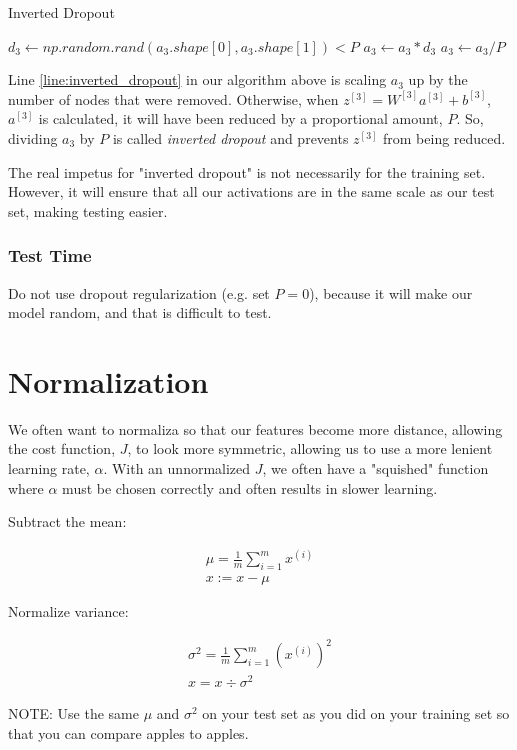 \documentclass{article}
\begin{document}
\begin{algorithm}[h]
\caption{Inverted Dropout}
$d_3 \gets np.random.rand(a_3.shape[0], a_3.shape[1]) < P$ \;
$a_3 \gets a_3 * d_3$ \;
$a_3 \gets a_3 / P$ \; \label{line:inverted_dropout}
\end{algorithm}

Line \ref{line:inverted_dropout} in our algorithm above is scaling $a_3$ up by the number of nodes that were removed.  Otherwise, when $z^{[3]} = W^{[3]} a^{[3]} + b^{[3]}$, $a^{[3]}$ is calculated, it will have been reduced by a proportional amount, $P$.  So, dividing $a_3$ by $P$ is called \textit{inverted dropout} and prevents $z^{[3]}$ from being reduced.

The real impetus for "inverted dropout" is not necessarily for the training set.  However, it will ensure that all our activations are in the same scale as our test set, making testing easier.

\subsubsection{Test Time}

Do not use dropout regularization (e.g. set $P = 0$), because it will make our model random, and that is difficult to test.

\section{Normalization}

We often want to normaliza so that our features become more distance, allowing the cost function, $J$, to look more symmetric, allowing us to use a more lenient learning rate, $\alpha$.  With an unnormalized $J$, we often have a "squished" function where $\alpha$ must be chosen correctly and often results in slower learning.

Subtract the mean:

\begin{gather}
\mu = \frac{1}{m} \sum_{i=1}^{m} x^{(i)} \\
x := x - \mu
\end{gather}


Normalize variance:

\begin{gather}
\sigma^2 = \frac{1}{m} \sum_{i=1}^{m} (x^{(i)})^2 \\
x = x \div \sigma^2
\end{gather}

NOTE: Use the same $\mu$ and $\sigma^2$ on your test set as you did on your training set so that you can compare apples to apples.
\end{document}
